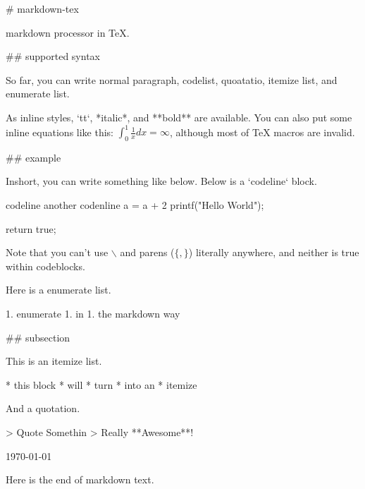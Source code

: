 \documentclass{article}
\begin{document}
\begin{markdown}

# markdown-tex

markdown processor in \TeX. 

## supported syntax

So far, you can write normal paragraph, codelist, quoatatio, itemize list, and enumerate list. 

As inline styles, `tt`, *italic*, and **bold** are available. You can also put some inline equations like this: $\int_0^1\frac{1}{x}dx = \infty$, although most of TeX macros are invalid.

## example

Inshort, you can write something like below.
Below is a `codeline` block. 

    codeline
        another codenline
    a = a + 2
    printf("Hello World");
    
    return true;

Note that you can't use $\backslash$ and parens ($\lbrace,\rbrace$) literally anywhere, and neither is true within codeblocks.

Here is a enumerate list.

1. enumerate
1. in 
1. the markdown way

## subsection

This is an itemize list. 

* this block
* will
* turn 
* into an 
* itemize

And a quotation. 

> Quote Somethin
> Really **Awesome**!

\hfill \today

Here is the end of markdown text.


\end{markdown}
\end{document}
